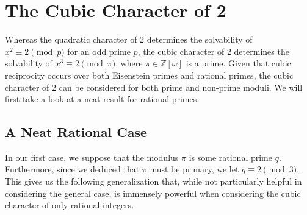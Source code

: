 \documentclass[10pt]{amsart}
\newcommand{\ZZ}{\mathbb{Z}}
\theoremstyle{plain}
\theoremstyle{definition}
\theoremstyle{remark}
\numberwithin{equation}{section}
\begin{document}
\section*{The Cubic Character of 2}
Whereas the quadratic character of 2 determines the solvability of $x^{2}\equiv 2\pmod{p}$ for an odd prime $p$, the cubic character of 2 determines the solvability of $x^{3}\equiv 2\pmod{\pi}$, where $\pi\in\ZZ[\omega]$ is a prime. Given that cubic reciprocity occurs over both Eisenstein primes and rational primes, the cubic character of 2 can be considered for both prime and non-prime moduli. We will first take a look at a neat result for rational primes. 

\subsection*{A Neat Rational Case} 
In our first case, we suppose that the modulus $\pi$ is some rational prime $q$. Furthermore, since we deduced that $\pi$ must be primary, we let $q\equiv 2\pmod{3}$. This gives us the following generalization that, while not particularly helpful in considering the general case, is immensely powerful when considering the cubic character of only rational integers. 
\end{document}
